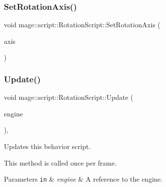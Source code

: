 \hypertarget{classmage_1_1script_1_1_rotation_script_aa4b49dc5e34da3e851d5aefc4c4a434b}{}\label{classmage_1_1script_1_1_rotation_script_aa4b49dc5e34da3e851d5aefc4c4a434b} 
\subsubsection{\texorpdfstring{Set\+Rotation\+Axis()}{SetRotationAxis()}}
{\footnotesize\ttfamily void mage\+::script\+::\+Rotation\+Script\+::\+Set\+Rotation\+Axis (\begin{DoxyParamCaption}\item[{\hyperlink{classmage_1_1script_1_1_rotation_script_a54e1d1d0af65f43f5bc5ad65a4b9c00a}{Rotation\+Axis}}]{axis }\end{DoxyParamCaption})\hspace{0.3cm}{\ttfamily [noexcept]}}

\hypertarget{classmage_1_1script_1_1_rotation_script_af4e83590b78094186b0dd107a58c7b3a}{}\label{classmage_1_1script_1_1_rotation_script_af4e83590b78094186b0dd107a58c7b3a} 
\subsubsection{\texorpdfstring{Update()}{Update()}}
{\footnotesize\ttfamily void mage\+::script\+::\+Rotation\+Script\+::\+Update (\begin{DoxyParamCaption}\item[{\mbox{[}\mbox{[}maybe\+\_\+unused\mbox{]} \mbox{]} \hyperlink{classmage_1_1_engine}{Engine} \&}]{engine }\end{DoxyParamCaption})\hspace{0.3cm}{\ttfamily [override]}, {\ttfamily [virtual]}}

Updates this behavior script.

This method is called once per frame.


\begin{DoxyParams}[1]{Parameters}
\mbox{\tt in}  & {\em engine} & A reference to the engine. \\
\hline
\end{DoxyParams}


